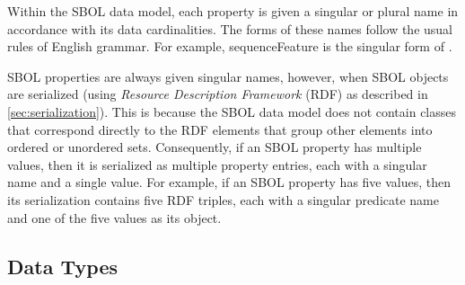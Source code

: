 Within the SBOL data model, each property is given a singular or plural name in accordance with its data cardinalities.
The forms of these names follow the usual rules of English grammar. For example, sequenceFeature is the singular form of .

SBOL properties are always given singular names, however, when SBOL objects are serialized (using \emph{Resource Description Framework} (RDF) as described in \ref{sec:serialization}).
This is because the SBOL data model does not contain classes that correspond directly to the RDF elements that group other elements into ordered or unordered sets. Consequently, if an SBOL property has multiple values, then it is serialized as multiple property entries, each with a singular name and a single value.
For example, if an SBOL property has five values, then its serialization contains five RDF triples, each with a singular predicate name and one of the five values as its object.

\subsection{Data Types}
\label{sec:datatypes}
\label{sec:String}
\label{sec:Integer}
\label{sec:Long}
\label{sec:Double}
\label{sec:Boolean}
\label{sec:URI}
\label{sec:literal}

